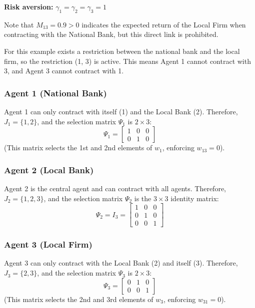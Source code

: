 \textbf{Risk aversion:} $\gamma_1 = \gamma_2 = \gamma_3 = 1$

Note that $M_{13} = 0.9 > 0$ indicates the expected return of the Local Firm when contracting with the National Bank, but this direct link is prohibited.

For this example exists a restriction between the national bank and the local firm, so the restriction (1, 3) is active. This means Agent 1 cannot contract with 3, and Agent 3 cannot contract with 1.

\subsubsection*{Agent 1 (National Bank)}
Agent 1 can only contract with itself (1) and the Local Bank (2). 
Therefore, $J_1 = \{1, 2\}$, and the selection matrix $\Psi_1$ is $2 \times 3$:
\begin{equation}
    \Psi_1 = 
    \begin{bmatrix}
        1 & 0 & 0 \\
        0 & 1 & 0
    \end{bmatrix}
\end{equation}
(This matrix selects the 1st and 2nd elements of $w_1$, enforcing $w_{13}=0$).

\subsubsection*{Agent 2 (Local Bank)}
Agent 2 is the central agent and can contract with all agents.
Therefore, $J_2 = \{1, 2, 3\}$, and the selection matrix $\Psi_2$ is the $3 \times 3$ identity matrix:
\begin{equation}
    \Psi_2 = I_3 =
    \begin{bmatrix}
        1 & 0 & 0 \\
        0 & 1 & 0 \\
        0 & 0 & 1
    \end{bmatrix}
\end{equation}

\subsubsection*{Agent 3 (Local Firm)}
Agent 3 can only contract with the Local Bank (2) and itself (3).
Therefore, $J_3 = \{2, 3\}$, and the selection matrix $\Psi_3$ is $2 \times 3$:
\begin{equation}
    \Psi_3 = 
    \begin{bmatrix}
        0 & 1 & 0 \\
        0 & 0 & 1
    \end{bmatrix}
\end{equation}
(This matrix selects the 2nd and 3rd elements of $w_3$, enforcing $w_{31}=0$).


